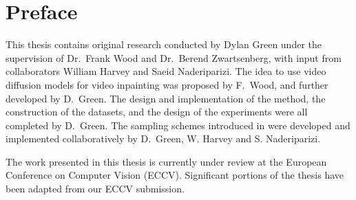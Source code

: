 
\chapter{Preface}
This thesis contains original research conducted by Dylan Green under the supervision of Dr.\ Frank Wood and Dr.\ Berend Zwartsenberg, with input from collaborators William Harvey and Saeid Naderiparizi. The idea to use video diffusion models for video inpainting was proposed by F.\ Wood, and further developed by D.\ Green. The design and implementation of the method, the construction of the datasets, and the design of the experiments were all completed by D.\ Green. The sampling schemes introduced in  were developed and implemented collaboratively by D.\ Green, W. Harvey and S. Naderiparizi. 

The work presented in this thesis is currently under review at the European 
Conference on Computer Vision (ECCV). Significant portions of the thesis have been adapted from our ECCV submission. 